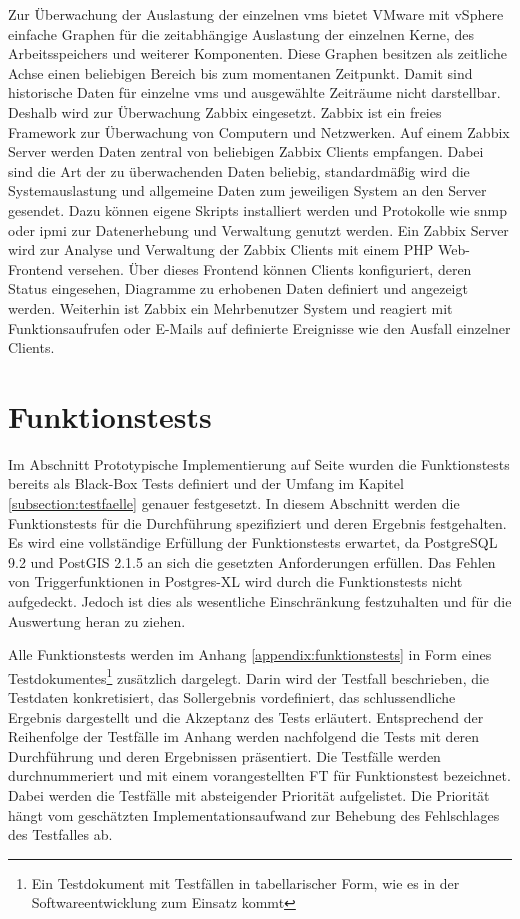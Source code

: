 Zur Überwachung der Auslastung der einzelnen \Gls{vm}s bietet VMware mit vSphere einfache Graphen für die zeitabhängige Auslastung der einzelnen Kerne, des Arbeitsspeichers und weiterer Komponenten.
Diese Graphen besitzen als zeitliche Achse einen beliebigen Bereich bis zum momentanen Zeitpunkt.
Damit sind historische Daten für einzelne \Gls{vm}s und ausgewählte Zeiträume nicht darstellbar.
Deshalb wird zur Überwachung Zabbix eingesetzt.
Zabbix ist ein freies Framework zur Überwachung von Computern und Netzwerken.
Auf einem Zabbix Server werden Daten zentral von beliebigen Zabbix Clients empfangen.
Dabei sind die Art der zu überwachenden Daten beliebig, standardmäßig wird die Systemauslastung und allgemeine Daten zum jeweiligen System an den Server gesendet.
Dazu können eigene Skripts installiert werden und Protokolle wie \Gls{snmp} oder \Gls{ipmi} zur Datenerhebung und Verwaltung genutzt werden.
Ein Zabbix Server wird zur Analyse und Verwaltung der Zabbix Clients mit einem PHP Web-Frontend versehen.
Über dieses Frontend können Clients konfiguriert, deren Status eingesehen, Diagramme zu erhobenen Daten definiert und angezeigt werden.
Weiterhin ist Zabbix ein Mehrbenutzer System und reagiert mit Funktionsaufrufen oder E-Mails auf definierte Ereignisse wie den Ausfall einzelner Clients.


\section{Funktionstests}
Im Abschnitt Prototypische Implementierung auf Seite \pageref{grundlagen-funktionstests} wurden die Funktionstests bereits als Black-Box Tests definiert und der Umfang im Kapitel \ref{subsection:testfaelle} genauer festgesetzt.
In diesem Abschnitt werden die Funktionstests für die Durchführung spezifiziert und deren Ergebnis festgehalten.
Es wird eine vollständige Erfüllung der Funktionstests erwartet, da PostgreSQL 9.2 und PostGIS 2.1.5 an sich die gesetzten Anforderungen erfüllen.
Das Fehlen von Triggerfunktionen in Postgres-XL wird durch die Funktionstests nicht aufgedeckt.
Jedoch ist dies als wesentliche Einschränkung festzuhalten und für die Auswertung heran zu ziehen.

Alle Funktionstests werden im Anhang \ref{appendix:funktionstests} in Form eines Testdokumentes\footnote{Ein Testdokument mit Testfällen in tabellarischer Form, wie es in der Softwareentwicklung zum Einsatz kommt} zusätzlich dargelegt.
Darin wird der Testfall beschrieben, die Testdaten konkretisiert, das Sollergebnis vordefiniert, das schlussendliche Ergebnis dargestellt und die Akzeptanz des Tests erläutert.
Entsprechend der Reihenfolge der Testfälle im Anhang werden nachfolgend die Tests mit deren Durchführung und deren Ergebnissen präsentiert.
Die Testfälle werden durchnummeriert und mit einem vorangestellten FT für Funktionstest bezeichnet.
Dabei werden die Testfälle mit absteigender Priorität aufgelistet.
Die Priorität hängt vom geschätzten Implementationsaufwand zur Behebung des Fehlschlages des Testfalles ab.

